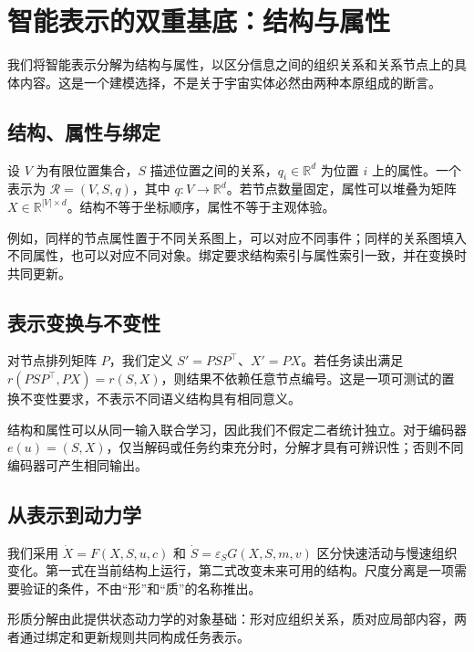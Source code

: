 \chapter{智能表示的双重基底：结构与属性}
\label{chp:dual_basis}
\label{sec:physics_dilemma}
\label{sec:cognition_dilemma}
\label{sec:axiom_system}

我们将智能表示分解为结构与属性，以区分信息之间的组织关系和关系节点上的具体内容。这是一个建模选择，不是关于宇宙实体必然由两种本原组成的断言。
\section{结构、属性与绑定}
设 $V$ 为有限位置集合，$S$ 描述位置之间的关系，$q_i\in\mathbb{R}^d$ 为位置 $i$ 上的属性。一个表示为 $\mathcal{R}=(V,S,q)$，其中 $q:V\to\mathbb{R}^d$。若节点数量固定，属性可以堆叠为矩阵 $X\in\mathbb{R}^{|V|\times d}$。结构不等于坐标顺序，属性不等于主观体验。

例如，同样的节点属性置于不同关系图上，可以对应不同事件；同样的关系图填入不同属性，也可以对应不同对象。绑定要求结构索引与属性索引一致，并在变换时共同更新。
\section{表示变换与不变性}
对节点排列矩阵 $P$，我们定义 $S'=PSP^\top$、$X'=PX$。若任务读出满足 $r(PSP^\top,PX)=r(S,X)$，则结果不依赖任意节点编号。这是一项可测试的置换不变性要求，不表示不同语义结构具有相同意义。

结构和属性可以从同一输入联合学习，因此我们不假定二者统计独立。对于编码器 $e(u)=(S,X)$，仅当解码或任务约束充分时，分解才具有可辨识性；否则不同编码器可产生相同输出。
\section{从表示到动力学}
我们采用 $\dot X=F(X,S,u,c)$ 和 $\dot S=\varepsilon_S G(X,S,m,v)$ 区分快速活动与慢速组织变化。第一式在当前结构上运行，第二式改变未来可用的结构。尺度分离是一项需要验证的条件，不由“形”和“质”的名称推出。

形质分解由此提供状态动力学的对象基础：形对应组织关系，质对应局部内容，两者通过绑定和更新规则共同构成任务表示。
